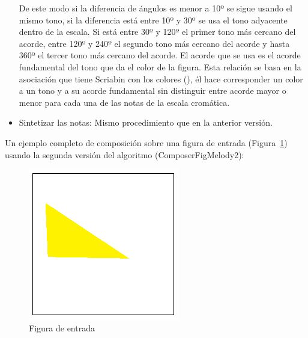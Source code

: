 \begin{itemize}
De este modo si la diferencia de ángulos es menor a 10º se sigue usando el mismo tono, si la diferencia está entre 10º y 30º se usa el tono adyacente dentro de la escala. Si está entre 30º y 120º el primer tono más cercano del acorde, entre 120º y 240º el segundo tono más cercano del acorde y hasta 360º el tercer tono más cercano del acorde. El acorde que se usa es el acorde fundamental del tono que da el color de la figura. Esta relación se basa en la asociación que tiene Scriabin con los colores (\cite{ScriabinQuintasColor}), él hace corresponder un color a un tono y a su acorde fundamental sin distinguir entre acorde mayor o menor para cada una de las notas de la escala cromática.

	\item Sintetizar las notas: Mismo procedimiento que en la anterior versión.

\end{itemize}

Un ejemplo completo de composición sobre una figura de entrada (Figura~\ref{fig:Figura0Voz1}) usando la segunda versión del algoritmo (ComposerFigMelody2): \\

		\begin{figure}[htbp]
		\centering
		\hspace*{0.0in}
		\includegraphics[scale=1.0]{graphics/simpletest1.png}
		\caption{Figura de entrada}
		\label{fig:Figura0Voz1}
		\end{figure}

